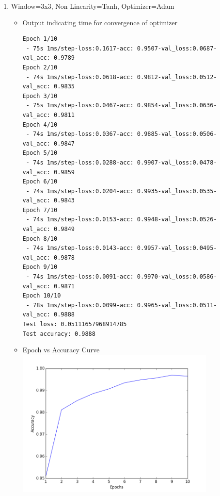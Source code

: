 \documentclass{article}
\begin{document}
\begin{enumerate}
\item Window=3x3, Non Linearity=Tanh, Optimizer=Adam
\begin{itemize}
    \item Output indicating time for convergence of optimizer\newline
    \begin{verbatim}
Epoch 1/10
 - 75s 1ms/step-loss:0.1617-acc: 0.9507-val_loss:0.0687-val_acc: 0.9789
Epoch 2/10
 - 74s 1ms/step-loss:0.0618-acc: 0.9812-val_loss:0.0512-val_acc: 0.9835
Epoch 3/10
 - 75s 1ms/step-loss:0.0467-acc: 0.9854-val_loss:0.0636-val_acc: 0.9811
Epoch 4/10
 - 74s 1ms/step-loss:0.0367-acc: 0.9885-val_loss:0.0506-val_acc: 0.9847
Epoch 5/10
 - 74s 1ms/step-loss:0.0288-acc: 0.9907-val_loss:0.0478-val_acc: 0.9859
Epoch 6/10
 - 74s 1ms/step-loss:0.0204-acc: 0.9935-val_loss:0.0535-val_acc: 0.9843
Epoch 7/10
 - 74s 1ms/step-loss:0.0153-acc: 0.9948-val_loss:0.0526-val_acc: 0.9849
Epoch 8/10
 - 74s 1ms/step-loss:0.0143-acc: 0.9957-val_loss:0.0495-val_acc: 0.9878
Epoch 9/10
 - 74s 1ms/step-loss:0.0091-acc: 0.9970-val_loss:0.0586-val_acc: 0.9871
Epoch 10/10
 - 78s 1ms/step-loss:0.0099-acc: 0.9965-val_loss:0.0511-val_acc: 0.9888
Test loss: 0.05111657968914785
Test accuracy: 0.9888
\end{verbatim}
    \item Epoch vs Accuracy Curve\newline
    \includegraphics[width=10cm]{4.png}
\end{itemize}


\end{enumerate}
\end{document}
